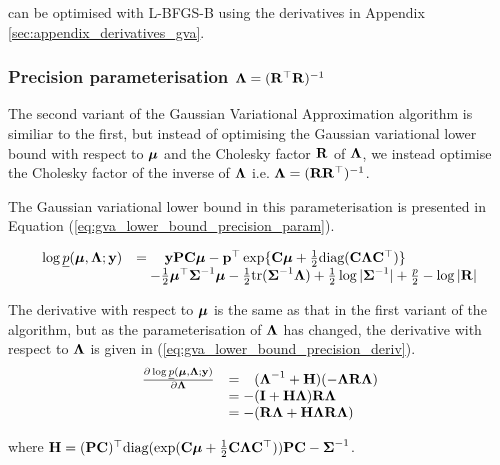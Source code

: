 \noindent can be optimised with L-BFGS-B using the derivatives in Appendix \ref{sec:appendix_derivatives_gva}.
	
\subsubsection{Precision parameterisation ${\boldsymbol \Lambda} = ({\bf R}^\top {\bf R})^{-1}$}
		
\noindent The second variant of the Gaussian Variational Approximation algorithm is similiar to the first, but
instead of optimising the Gaussian variational lower bound with respect to ${\boldsymbol \mu}$ and the Cholesky factor
${\bf R}$ of ${\boldsymbol \Lambda}$, we instead optimise the Cholesky factor of the inverse of ${\boldsymbol \Lambda}$ i.e. ${\boldsymbol \Lambda} =
({\bf R} {\bf R}^\top)^{-1}$.

The Gaussian variational lower bound in this parameterisation is presented in Equation
(\ref{eq:gva_lower_bound_precision_param}).

\begin{equation}
\label{eq:gva_lower_bound_precision_param}
\begin{array}{ll}
	\log \underline{p}({\boldsymbol \mu}, {\boldsymbol \Lambda}; {\bf y}) & = \quad {\bf y}{\bf P}{\bf C} {\boldsymbol\mu} - {\bf p}^\top \exp\{{\bf C} {\boldsymbol \mu} + \tfrac{1}{2} \text{diag}({\bf C} {\boldsymbol \Lambda} {\bf C}^\top)\} \\
	&\quad - \tfrac{1}{2} {\boldsymbol \mu}^\top {\boldsymbol\Sigma}^{-1} {\boldsymbol \mu} - \tfrac{1}{2} \text{tr}{({\boldsymbol\Sigma}^{-1} {\boldsymbol\Lambda})}
        + \tfrac{1}{2} \log{|{\boldsymbol\Sigma}^{-1}|} + \tfrac{p}{2} - \log{|{\bf R}|}
\end{array}
\end{equation}
		
\noindent The derivative with respect to ${\boldsymbol \mu}$ is the same as that in the first variant of the algorithm, but 
as the parameterisation of ${\boldsymbol \Lambda}$ has changed, the  derivative with respect to ${\boldsymbol \Lambda}$ is given in
(\ref{eq:gva_lower_bound_precision_deriv}).
\begin{equation}
\label{eq:gva_lower_bound_precision_deriv}
\begin{array}{ll}
	\frac{\partial \log \underline{p}({\boldsymbol \mu}, {\boldsymbol \Lambda}; {\bf y})}{\partial {\boldsymbol\Lambda}}
	  & = \hphantom{-}({\boldsymbol \Lambda}^{-1} + {\bf H})(-{\boldsymbol \Lambda} {\bf R} {\boldsymbol \Lambda}) \\
	  & = -({\bf I} + {\bf H}{\boldsymbol \Lambda}){\bf R}{\boldsymbol \Lambda}                           \\
	  & = - ({\bf R}{\boldsymbol \Lambda} + {\bf H}{\boldsymbol \Lambda}{\bf R}{\boldsymbol \Lambda})                  
\end{array}
\end{equation}
		
\noindent where ${\bf H} = ({\bf P} {\bf C})^\top \text{diag}(\exp({\bf C} {\boldsymbol \mu} + \frac{1}{2} {\bf C} {\boldsymbol \Lambda} {\bf C}^\top)) {\bf P} {\bf C} - {\boldsymbol \Sigma}^{-1}$.
		
